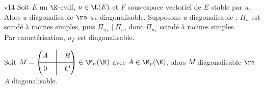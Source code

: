 \documentclass[11pt]{article}
\begin{document}
\begin{prop}{$\star$}{14}
    Soit $E$ un $\K$-evdf, $u\in\L(E)$ et $F$ sous-espace vectoriel de $E$ stable par $u$.\\
    Alors $u$ diagonalisable $\ra$ $u_F$ diagonalisable.
    \tcblower
    Supposons $u$ diagonalisable : $\Pi_u$ est scindé à racines simples, puis $\Pi_{u_F} \mid \Pi_u$, donc $\Pi_{u_F}$ scindé à racines simples.\\
    Par caractérisation, $u_F$ est diagonalisable.
\end{prop}

\begin{corr}{}{}
    Soit $M=\begin{pmatrix} A & \Big| & B \\ \hline 0 & \Big| & C\end{pmatrix}\in\M_n(\K)$ avec $A\in\M_p(\K)$, alors $M$ diagonalisable $\ra$ $A$ diagonalisable. 
\end{corr}

\pagebreak
\end{document}
